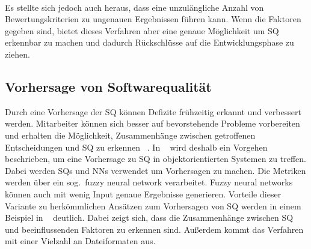 \\
Es stellte sich jedoch auch heraus, dass eine unzulängliche Anzahl von Bewertungskriterien zu ungenauen Ergebnissen führen kann.
Wenn die Faktoren gegeben sind, bietet dieses Verfahren aber eine genaue Möglichkeit um SQ erkennbar zu machen und dadurch Rückschlüsse auf die Entwicklungsphase zu ziehen.

\subsection{Vorhersage von Softwarequalität}
Durch eine Vorhersage der SQ können Defizite frühzeitig erkannt und verbessert werden. Mitarbeiter können sich besser auf bevorstehende Probleme vorbereiten und erhalten die Möglichkeit, Zusammenhänge zwischen getroffenen Entscheidungen und SQ zu erkennen ~\cite{Peng2009}. In ~\cite{Peng2009} wird deshalb ein Vorgehen beschrieben, um eine Vorhersage zu SQ in objektorientierten Systemen zu treffen. Dabei werden SQs und NNs verwendet um Vorhersagen zu machen. Die Metriken werden über ein sog.~fuzzy neural network verarbeitet. Fuzzy neural networks können auch mit wenig Input genaue Ergebnisse generieren.
Vorteile dieser Variante zu herkömmlichen Ansätzen zum Vorhersagen von SQ werden in einem Beispiel in ~\cite{Peng2009} deutlich. Dabei zeigt sich, dass die Zusammenhänge zwischen SQ und beeinflussenden Faktoren zu erkennen sind. Außerdem kommt das Verfahren mit einer Vielzahl an Dateiformaten aus.
\\
\\
\\